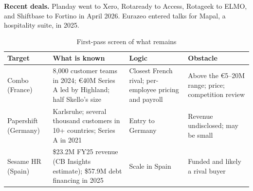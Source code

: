 \textbf{Recent deals.} Planday went to Xero, Rotaready to Access, Rotageek to ELMO, and Shiftbase to Fortino in April 2026. Eurazeo entered talks for Mapal, a hospitality suite, in 2025.

\begin{table}[H]
\caption{First-pass screen of what remains}
\vspace{-2pt}
\tbl
\begin{tabularx}{\textwidth}{@{}P{2.2cm}P{5cm}LL@{}}
\toprule
Target & What is known & Logic & Obstacle \\
\midrule
Combo (France) & 8,000 customer teams in 2024; €40M Series A led by Highland; half Skello's size & Closest French rival; per-employee pricing and payroll & Above the €5--20M range; price; competition review \\
Papershift (Germany) & Karlsruhe; several thousand customers in 10+ countries; Series A in 2021 & Entry to Germany & Revenue undisclosed; may be small \\
Sesame HR (Spain) & \$23.2M FY25 revenue (CB Insights estimate); \$57.9M debt financing in 2025 & Scale in Spain & Funded and likely a rival buyer \\
\bottomrule
\end{tabularx}
\end{table}
\vspace{-4pt}

